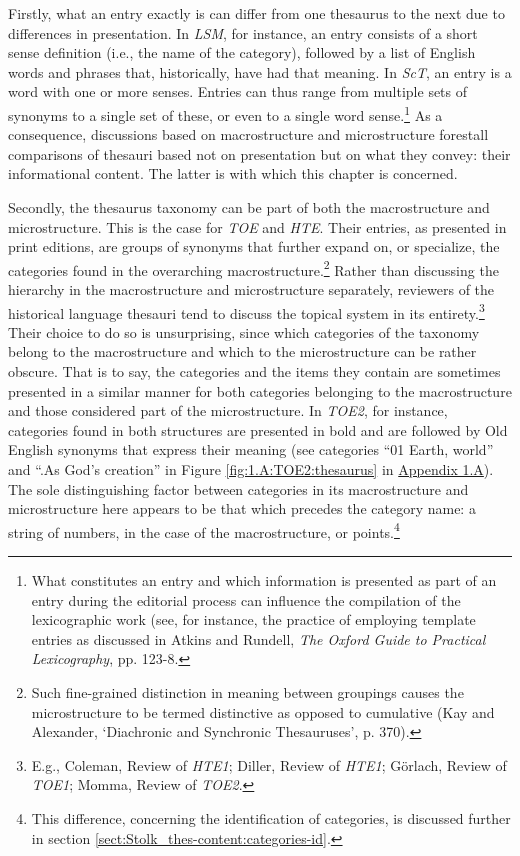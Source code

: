 Firstly, what an entry exactly is can differ from one thesaurus to the next due to differences in presentation. In \textit{LSM}, for instance, an entry consists of a short sense definition (i.e., the name of the category), followed by a list of English words and phrases that, historically, have had that meaning. 
In \textit{ScT}, an entry is a word with one or more senses. Entries can thus range from multiple sets of synonyms to a single set of these, or even to a single word sense.\footnote{What constitutes an entry and which information is presented as part of an entry during the editorial process can influence the compilation of the lexicographic work (see, for instance, the practice of employing template entries as discussed in Atkins and Rundell, \textit{The Oxford Guide to Practical Lexicography}, pp. 123-8.} As a consequence, discussions based on macrostructure and microstructure forestall comparisons of thesauri based not on presentation but on what they convey: their informational content. The latter is with which this chapter is concerned.

Secondly, the thesaurus taxonomy can be part of both the macrostructure and microstructure. This is the case for \textit{TOE} and \textit{HTE}. Their entries, as presented in print editions, are groups of synonyms that further expand on, or specialize, the categories found in the overarching macrostructure.\footnote{Such fine-grained distinction in meaning between groupings causes the microstructure to be termed distinctive as opposed to cumulative (Kay and Alexander, `Diachronic and Synchronic Thesauruses', p. 370).} Rather than discussing the hierarchy in the macrostructure and microstructure separately, reviewers of the historical language thesauri tend to discuss the topical system in its entirety.\footnote{E.g., Coleman, Review of \textit{HTE1}; Diller, Review of \textit{HTE1}; Görlach, Review of \textit{TOE1}; Momma, Review of \textit{TOE2}.} Their choice to do so is unsurprising, since which categories of the taxonomy belong to the macrostructure and which to the microstructure can be rather obscure. That is to say, the categories and the items they contain are sometimes presented in a similar manner for both categories belonging to the macrostructure and those considered part of the microstructure. In \textit{TOE2}, for instance, categories found in both structures are presented in bold and are followed by Old English synonyms that express their meaning (see categories ``01 Earth, world'' and ``.As God's creation'' in Figure \ref{fig:1.A:TOE2:thesaurus} in \hyperref[Appendix1.A]{Appendix 1.A}). The sole distinguishing factor between categories in its macrostructure and microstructure here appears to be that which precedes the category name: a string of numbers, in the case of the macrostructure, or points.\footnote{This difference, concerning the identification of categories, is discussed further in section \ref{sect:Stolk_thes-content:categories-id}.}

